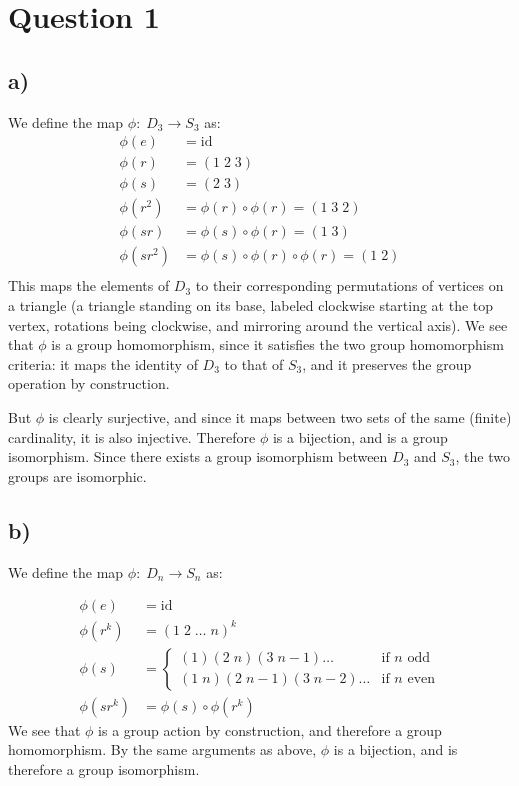 \documentclass[a4paper,12pt]{article}
\begin{document}
\section*{Question 1}

\subsection*{a)}

We define the map $\phi: \; D_3 \to S_3$ as:
\begin{align*}
    \phi(e) &= \mathrm{id} \\
    \phi(r) &= (1 \; 2 \; 3) \\
    \phi(s) &= (2 \; 3) \\
    \phi(r^2) &= \phi(r) \circ \phi(r) = (1 \; 3 \; 2) \\
    \phi(sr) &= \phi(s) \circ \phi(r) = (1 \; 3) \\
    \phi(sr^2) &= \phi(s) \circ \phi(r) \circ \phi(r) =  (1 \; 2) \\
\end{align*}
This maps the elements of $D_3$ to their corresponding permutations of vertices on a triangle (a triangle standing on its base, labeled clockwise starting at the top vertex, rotations being clockwise, and mirroring around the vertical axis). We see that $\phi$ is a group homomorphism, since it satisfies the two group homomorphism criteria: it maps the identity of $D_3$ to that of $S_3$, and it preserves the group operation by construction.

But $\phi$ is clearly surjective, and since it maps between two sets of the same (finite) cardinality, it is also injective. Therefore $\phi$ is a bijection, and is a group isomorphism. Since there exists a group isomorphism between $D_3$ and $S_3$, the two groups are isomorphic.

\subsection*{b)}

We define the map $\phi: \; D_n \to S_n$ as:

\begin{align*}
    \phi(e) &= \mathrm{id} \\
    \phi(r^k) &= (1 \; 2 \; \ldots \; n)^k \\
    \phi(s) &= \begin{cases}
        (1)(2 \; n)(3 \; n - 1)\ldots &\text{if $n$ odd} \\
        (1 \; n)(2 \; n - 1)(3 \; n - 2)\ldots &\text{if $n$ even}
    \end{cases} \\
    \phi(sr^k) &= \phi(s) \circ \phi(r^k)
\end{align*}
We see that $\phi$ is a group action by construction, and therefore a group homomorphism. By the same arguments as above, $\phi$ is a bijection, and is therefore a group isomorphism.
\end{document}
